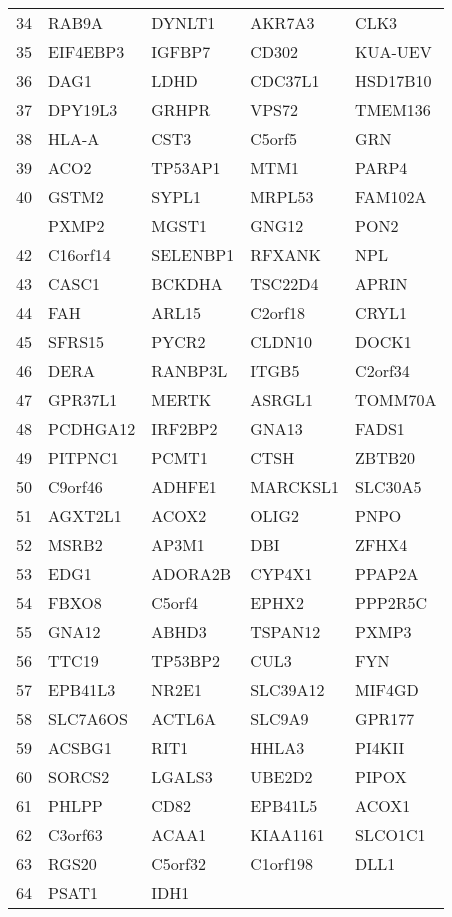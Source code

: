 \documentclass[letterpaper,12pt]{article}
\numberwithin{equation}{appendix}
\begin{document}
{{\begin{longtable}{lllll}
34&RAB9A&DYNLT1&AKR7A3&CLK3\tabularnewline
35&EIF4EBP3&IGFBP7&CD302&KUA-UEV\tabularnewline
36&DAG1&LDHD&CDC37L1&HSD17B10\tabularnewline
37&DPY19L3&GRHPR&VPS72&TMEM136\tabularnewline
38&HLA-A&CST3&C5orf5&GRN\tabularnewline
39&ACO2&TP53AP1&MTM1&PARP4\tabularnewline
40&GSTM2&SYPL1&MRPL53&FAM102A\tabularnewline
\newpage
41&PXMP2&MGST1&GNG12&PON2\tabularnewline
42&C16orf14&SELENBP1&RFXANK&NPL\tabularnewline
43&CASC1&BCKDHA&TSC22D4&APRIN\tabularnewline
44&FAH&ARL15&C2orf18&CRYL1\tabularnewline
45&SFRS15&PYCR2&CLDN10&DOCK1\tabularnewline
46&DERA&RANBP3L&ITGB5&C2orf34\tabularnewline
47&GPR37L1&MERTK&ASRGL1&TOMM70A\tabularnewline
48&PCDHGA12&IRF2BP2&GNA13&FADS1\tabularnewline
49&PITPNC1&PCMT1&CTSH&ZBTB20\tabularnewline
50&C9orf46&ADHFE1&MARCKSL1&SLC30A5\tabularnewline
51&AGXT2L1&ACOX2&OLIG2&PNPO\tabularnewline
52&MSRB2&AP3M1&DBI&ZFHX4\tabularnewline
53&EDG1&ADORA2B&CYP4X1&PPAP2A\tabularnewline
54&FBXO8&C5orf4&EPHX2&PPP2R5C\tabularnewline
55&GNA12&ABHD3&TSPAN12&PXMP3\tabularnewline
56&TTC19&TP53BP2&CUL3&FYN\tabularnewline
57&EPB41L3&NR2E1&SLC39A12&MIF4GD\tabularnewline
58&SLC7A6OS&ACTL6A&SLC9A9&GPR177\tabularnewline
59&ACSBG1&RIT1&HHLA3&PI4KII\tabularnewline
60&SORCS2&LGALS3&UBE2D2&PIPOX\tabularnewline
61&PHLPP&CD82&EPB41L5&ACOX1\tabularnewline
62&C3orf63&ACAA1&KIAA1161&SLCO1C1\tabularnewline
63&RGS20&C5orf32&C1orf198&DLL1\tabularnewline
64&PSAT1&IDH1&&\tabularnewline
\end{longtable}

}}
\end{document}
